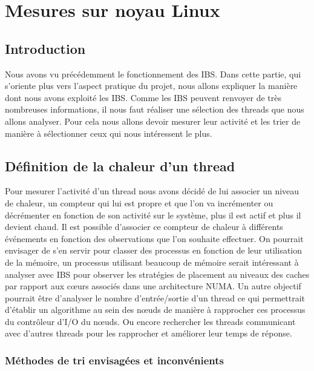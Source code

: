 \chapter{Mesures sur noyau Linux}

  \section{Introduction}

    Nous avons vu précédemment le fonctionnement des IBS. Dans cette partie, qui
    s'oriente plus vers l'aspect pratique du projet, nous allons expliquer la
    manière dont nous avons exploité les IBS. Comme les IBS peuvent renvoyer de
    très nombreuses informations, il nous faut réaliser une sélection des
    threads que nous allons analyser. Pour cela nous allons devoir mesurer leur
    activité et les trier de manière à sélectionner ceux qui nous intéressent le
    plus.

  \section{Définition de la chaleur d'un thread}

    Pour mesurer l'activité d'un thread nous avons décidé de lui associer un
    niveau de chaleur, un compteur qui lui est propre et que l'on va incrémenter
    ou décrémenter en fonction de son activité sur le système, plus il est actif
    et plus il devient chaud. Il est possible d'associer ce compteur de chaleur
    à différents événements en fonction des observations que l'on souhaite
    effectuer. On pourrait envisager de s'en servir pour classer des processus
    en fonction de leur utilisation de la mémoire, un processus utilisant
    beaucoup de mémoire serait intéressant à analyser avec IBS pour observer les
    stratégies de placement au niveaux des caches par rapport aux cœurs associés
    dans une architecture NUMA. Un autre objectif pourrait être d'analyser le
    nombre d'entrée/sortie d'un thread ce qui permettrait d'établir un
    algorithme au sein des nœuds de manière à rapprocher ces processus du
    contrôleur d'I/O du nœuds. Ou encore rechercher les threads communicant avec
    d'autres threads pour les rapprocher et améliorer leur temps de réponse.

    \subsection{Méthodes de tri envisagées et inconvénients}

